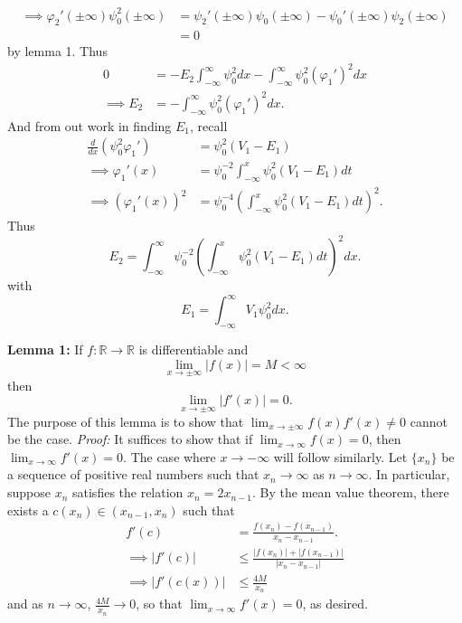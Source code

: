 \documentclass{article}
\begin{document}
\begin{itemize}
\begin{itemize}
\begin{align*}
             \implies \varphi_2'(\pm \infty)\psi_0^2(\pm \infty) &= \psi_2'(\pm \infty)\psi_0(\pm \infty) - \psi_0'(\pm \infty)\psi_2(\pm \infty)\\
             &= 0 
        \end{align*}
        by lemma 1. Thus 
        \begin{align*}
            0 &= -E_2\int_{-\infty}^{\infty}\psi_0^2dx - \int_{-\infty}^{\infty}\psi_0^2(\varphi_1')^2dx\\
            \implies E_2 &= -\int_{-\infty}^{\infty}\psi_0^2(\varphi_1')^2dx.
        \end{align*}
        And from out work in finding $E_1$, recall
        \begin{align*}
           \frac{d}{dx}(\psi_0^2\varphi_1') &= \psi_0^2(V_1 - E_1)\\
           \implies \varphi_1'(x) &= \psi_0^{-2}\int_{-\infty}^x \psi_0^2(V_1 - E_1)dt\\
           \implies (\varphi_1'(x))^2 &= \psi_0^{-4}\left(\int_{-\infty}^x \psi_0^2(V_1 - E_1)dt\right)^2.
        \end{align*}
        Thus
        \[E_2 = \int_{-\infty}^{\infty}\psi_0^{-2}\left(\int_{-\infty}^x\psi_0^2(V_1 - E_1)dt\right)^2dx.\]
        with
        \[E_1 = \int_{-\infty}^{\infty}V_1\psi_0^2dx.\]
        \vspace{1cm}

        \textbf{Lemma 1:} If $f: \mathbb{R} \to \mathbb{R}$ is differentiable and 
        \[\lim_{x \to \pm \infty} |f(x)| = M < \infty\]
        then 
        \[\lim_{x \to \pm \infty} |f'(x)| = 0.\]
        The purpose of this lemma is to show that $\lim_{x \to \pm\infty} f(x)f'(x) \neq 0$ cannot be the case.
        \newline\newline
        \textit{Proof:} It suffices to show that if $\lim_{x \to \infty} f(x) = 0$, then $\lim_{x \to \infty} f'(x) = 0$. The case where $x \to -\infty$ will follow similarly. Let $\{x_n\}$ be a sequence of positive real numbers such that $x_n \to \infty$ as $n \to \infty$. In particular, suppose $x_n$ satisfies the relation $x_n = 2x_{n-1}$. By the mean value theorem, there exists a $c(x_n) \in (x_{n-1}, x_n)$ such that
        \begin{align*}
            f'(c) &= \frac{f(x_n) - f(x_{n-1})}{x_n - x_{n-1}}.\\
            \implies |f'(c)| &\leq \frac{|f(x_n)| + |f(x_{n-1})|}{|x_n - x_{n-1}|}\\
            \implies |f'(c(x))| &\leq \frac{4M}{x_n}
        \end{align*}
        and as $n \to \infty$, $\frac{4M}{x_{n}} \to 0$, so that $\lim_{x \to \infty} f'(x) = 0$, as desired.
        \newline\newline\newline
        

\end{itemize}
\end{itemize}
\end{document}
